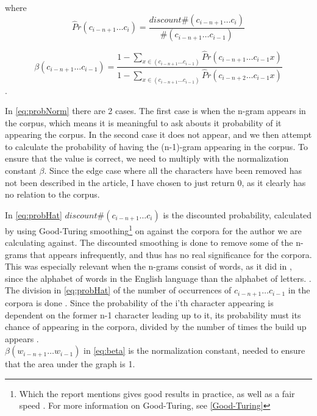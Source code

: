 where 
\begin{equation}
\label{eq:probHat}
\hat{P}r(c_{i - n + 1} \ldots c_{i}) = \frac{discount \#(c_{i - n + 1} \ldots c_{i})}{\#(c_{i - n + 1} \ldots c_{i-1})}
\end{equation}

\begin{equation}
\label{eq:beta}
\beta(c_{i - n + 1} \ldots c_{i-1}) = 
\frac
{1 - \sum_{x \in (c_{i - n + 1} \ldots c_{i-1})}\hat{P}r(c_{i - n + 1} \ldots c_{i-1} x)}
{1 - \sum_{x \in (c_{i - n + 1} \ldots c_{i-1})}\hat{P}r(c_{i - n + 2} \ldots c_{i-1} x)}
\end{equation}.

In \ref{eq:probNorm} there are 2 cases. The first case is when the n-gram appears in the corpus, which means it is meaningful to ask abouts it probability of it appearing the corpus. In the second case it does not appear, and we then attempt to calculate the probability of having the (n-1)-gram appearing in the corpus. To ensure that the value is correct, we need to multiply with the normalization constant $\beta$. Since the edge case where all the characters have been removed has not been described in the article, I have chosen to just return 0, as it clearly has no relation to the corpus.

In \ref{eq:probHat} $discount\#(c_{i - n + 1} \ldots c_{i})$ 
is the discounted probability, calculated by using Good-Turing smoothing\footnote{Which the report mentions gives good results in practice, as well as a fair speed \cite{nr4}. For more information on Good-Turing, see \ref{Good-Turing}} on against the corpora for the author we are calculating against. The discounted smoothing is done to remove some of the n-grams that appears infrequently, and thus has no real significance for the corpora. This was especially relevant when the n-grams consist of words, as it did in \cite{nr4}, since the alphabet of words in the English language than the alphabet of letters. . The division in \ref{eq:probHat} of the number of occurrences of $c_{i - n + 1} \ldots c_{i - 1}$ in the corpora is done . Since the probability of the i'th character appearing is dependent on the former n-1 character leading up to it, its probability must its chance of appearing in the corpora, divided by the number of times the build up appears .\\

$\beta (w_{i - n + 1}\ldots w_{i -1})$ in \ref{eq:beta} is the normalization constant, needed to ensure that the area under the graph is 1.  


